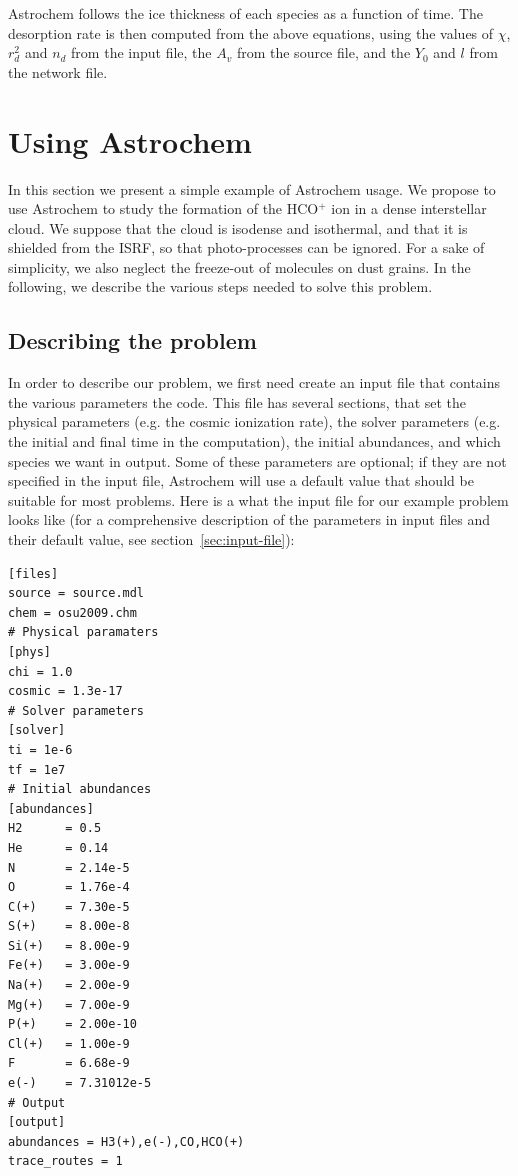 \documentclass[a4paper,12pt]{article}
\begin{document}
Astrochem follows the ice thickness of each species as a function of
time. The desorption rate is then computed from the above equations,
using the values of $\chi$, $r_{d}^2$ and $n_{d}$ from the input file,
the $A_{v}$ from the source file, and the $Y_{0}$ and $l$ from the
network file.

\section{Using Astrochem}
\label{sec:using-astrochem}

In this section we present a simple example of Astrochem usage.  We
propose to use Astrochem to study the formation of the HCO$^{+}$ ion
in a dense interstellar cloud. We suppose that the cloud is isodense
and isothermal, and that it is shielded from the ISRF, so that
photo-processes can be ignored. For a sake of simplicity, we also
neglect the freeze-out of  molecules on dust grains. In the following,
we describe the various steps needed to solve this problem.

\subsection{Describing the problem}
\label{sec:describing-problem}

In order to describe our problem, we first need create an input file
that contains the various parameters the code. This file has several
sections, that set the physical parameters (e.g. the cosmic ionization
rate), the solver parameters (e.g. the initial and final time in the
computation), the initial abundances, and which species we want in
output. Some of these parameters are optional; if they are not
specified in the input file, Astrochem will use a default value that
should be suitable for most problems. Here is a what the input file
for our example problem looks like (for a comprehensive description of
the parameters in input files and their default value, see
section~\ref{sec:input-file}):

\begin{verbatim}
[files]
source = source.mdl
chem = osu2009.chm
# Physical paramaters
[phys]
chi = 1.0
cosmic = 1.3e-17
# Solver parameters
[solver]
ti = 1e-6
tf = 1e7
# Initial abundances
[abundances]
H2      = 0.5
He      = 0.14
N       = 2.14e-5
O       = 1.76e-4
C(+)    = 7.30e-5
S(+)    = 8.00e-8
Si(+)   = 8.00e-9
Fe(+)   = 3.00e-9
Na(+)   = 2.00e-9
Mg(+)   = 7.00e-9
P(+)    = 2.00e-10
Cl(+)   = 1.00e-9
F       = 6.68e-9
e(-)    = 7.31012e-5
# Output
[output]
abundances = H3(+),e(-),CO,HCO(+)
trace_routes = 1
\end{verbatim}
\end{document}
